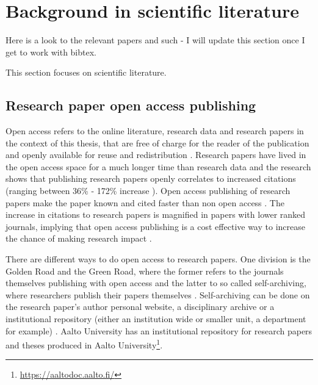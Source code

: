 \chapter{Background in scientific literature}
\label{chapter:background} 

Here is a look to the relevant papers and such - I will update this section once
I get to work with bibtex.

This section focuses on scientific literature.

\section{Research paper open access publishing}
\label{sec:benefits_open_publishing}

Open access refers to the online literature, research data and research papers in the
context of this thesis, that are free of charge for the reader of the
publication and openly available for reuse and redistribution
\cite{suber2007open, bailey2008open}. Research papers
have lived in the open access space for a much longer time than research data
and the research shows that publishing research papers openly correlates to
increased citations (ranging between 36\% - 172\% increase
\cite{DBLP:journals/corr/abs-cs-0606079, harnad2004comparing, eysenbach2006citation}).
Open access publishing of research papers make the
paper known and cited faster than non open access \cite{harnad2004comparing}.
The increase in citations to research papers is magnified in papers with lower
ranked journals, implying that open access publishing is a cost effective way
to increase the chance of making research impact
\cite{DBLP:journals/oir/XiaN12}.

There are different ways to do open access to research papers. One division is
the Golden Road and the Green Road, where the former refers to the journals
themselves publishing with open access and the latter to so called
self-archiving, where researchers publish their papers themselves \cite{harnad2004access}.
Self-archiving can be done on the research paper's author personal website,
a disciplinary archive or a institutional repository (either an institution
wide or smaller unit, a department for example) \cite{bailey2008open}. Aalto
University has an institutional repository for research papers and theses
produced in Aalto University\footnote{\url{https://aaltodoc.aalto.fi/}}.

